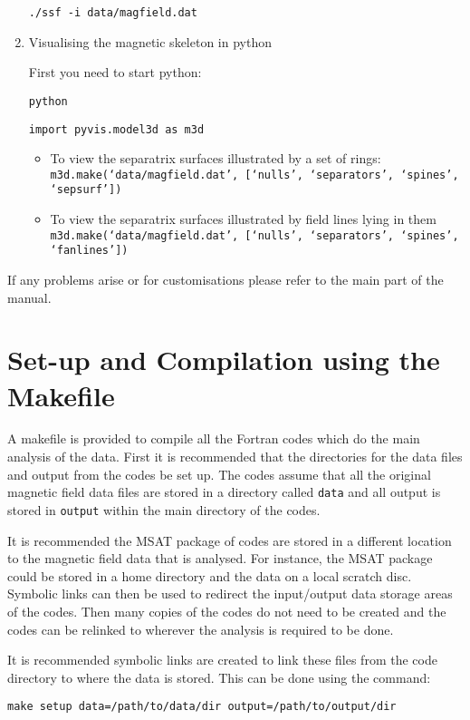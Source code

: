 \documentclass[12pt]{article}
\begin{document}
\begin{enumerate}
      \texttt{./ssf -i data/magfield.dat}

      \item Visualising the magnetic skeleton in python

      First you need to start python:

      \texttt{python}

      \texttt{import pyvis.model3d as m3d}

      \begin{itemize}
        \item To view the separatrix surfaces illustrated by a set of rings:
        \texttt{m3d.make(`data/magfield.dat', [`nulls', `separators', `spines', `sepsurf'])}
        \item To view the separatrix surfaces illustrated by field lines lying in them
        \texttt{m3d.make(`data/magfield.dat', [`nulls', `separators', `spines', `fanlines'])}
      \end{itemize}
    \end{enumerate}
    If any problems arise or for customisations please refer to the main part of the manual.

  \section{Set-up and Compilation using the Makefile}

    A makefile is provided to compile all the Fortran codes which do the main analysis of the data. First it is recommended that the directories for the data files and output from the codes be set up. The codes assume that all the original magnetic field data files are stored in a directory called \texttt{data} and all output is stored in \texttt{output} within the main directory of the codes.

    It is recommended the MSAT package of codes are stored in a different location to the magnetic field data that is analysed. For instance, the MSAT package could be stored in a home directory and the data on a local scratch disc. Symbolic links can then be used to redirect the input/output data storage areas of the codes. Then many copies of the codes do not need to be created and the codes can be relinked to wherever the analysis is required to be done.

    It is recommended symbolic links are created to link these files from the code directory to where the data is stored. This can be done using the command:

    \texttt{make setup data=/path/to/data/dir output=/path/to/output/dir}
\end{document}
